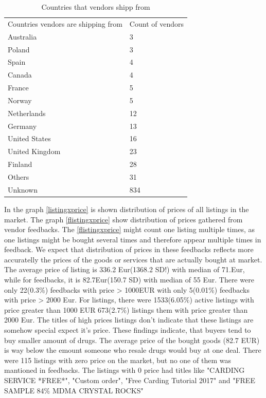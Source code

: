 \documentclass[
  digital, %
  table,   %
  lof,     %
  lot,     %
  oneside
]{fithesis3}
\begin{document}
\begin{table}
    \caption{Countries that vendors shipp from}
    \label{shipcount}
    \begin{tabular}{|l|l|}
    Countries vendors are shipping from  & Count of vendors\\
        Australia                                    & 3   \\ 
        Poland                                       & 3   \\ 
        Spain                                        & 4   \\ 
        Canada                                       & 4   \\ 
        France                                       & 5   \\ 
        Norway                                       & 5   \\ 
        Netherlands                                  & 12  \\ 
        Germany                                      & 13  \\ 
        United States                                & 16  \\ 
        United Kingdom                               & 23  \\ 
        Finland                                      & 28  \\ 
        Others                                       & 31   \\
        Unknown                                      & 834  
    \end{tabular}
\end{table}


In the graph \ref{listingxprice} is shown distribution of prices of all listings in
 the market. 
 The graph \ref{flistingxprice} show distribution of prices gathered
 from vendor feedbacks. The \ref{flistingxprice} might count one listing
 multiple times, as one listings might be bought several times
 and therefore appear multiple times in feedback. We expect that distribution
 of prices in these feedbacks reflects more accuratelly the prices of the goods or services
 that are actually bought at market.
 The average price of listing is 336.2 Eur(1368.2 SD!) with median of 71.Eur,
 while for feedbacks, it is 82.7Eur(150.7 SD) with median of 55 Eur.
  There were only 22(0.3\%) feedbacks with price > 1000EUR
 with only 5(0.01\%) feedbacks with price > 2000 Eur.
  For listings, there were 1533(6.05\%) active listings
 with price greater than 1000 EUR
 673(2.7\%) listings them with price greater than 2000 Eur.
 The titles of high prices listings don't indicate that 
 these listings are somehow special expect it's price.
 These findings indicate, that buyers tend to buy
 smaller amount of drugs. The average price of the bought goods (82.7 EUR)
 is way below the emount someone who resale drugs would buy at one deal.
 There were 115 listings with zero price on the market,
 but no one of them was mantioned in feedbacks.
 The listings with 0 price had titles like "CARDING SERVICE *FREE*",
 "Custom order", "Free Carding Tutorial 2017" and "FREE SAMPLE 84\% MDMA CRYSTAL ROCKS"
\end{document}

